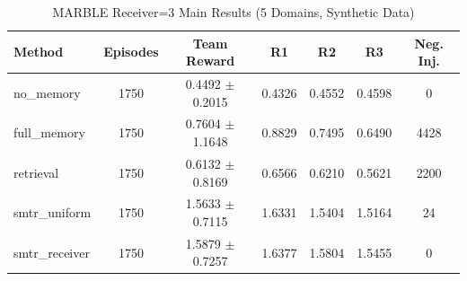 \begin{table}[t]
\caption{MARBLE Receiver=3 Main Results (5 Domains, Synthetic Data)}
\label{tab:receiver3_main}
\centering
\begin{tabular}{l c c c c c c}
\toprule
Method & Episodes & Team Reward & R1 & R2 & R3 & Neg. Inj. \\
\midrule
no\_memory & 1750 & 0.4492 $\pm$ 0.2015 & 0.4326 & 0.4552 & 0.4598 & 0 \\
full\_memory & 1750 & 0.7604 $\pm$ 1.1648 & 0.8829 & 0.7495 & 0.6490 & 4428 \\
retrieval & 1750 & 0.6132 $\pm$ 0.8169 & 0.6566 & 0.6210 & 0.5621 & 2200 \\
smtr\_uniform & 1750 & 1.5633 $\pm$ 0.7115 & 1.6331 & 1.5404 & 1.5164 & 24 \\
smtr\_receiver & 1750 & 1.5879 $\pm$ 0.7257 & 1.6377 & 1.5804 & 1.5455 & 0 \\
\bottomrule
\end{tabular}
\end{table}